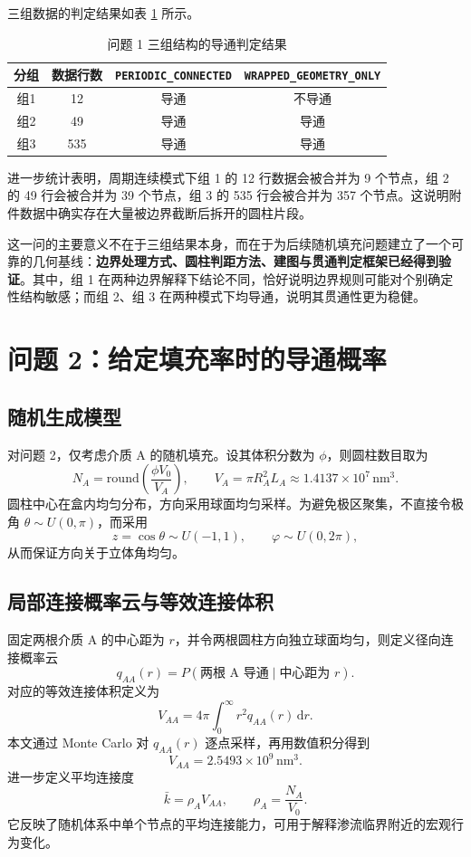 三组数据的判定结果如表 \ref{tab:q1_result} 所示。

\begin{table}[htbp]
    \centering
    \caption{问题 1 三组结构的导通判定结果}
    \label{tab:q1_result}
    \begin{tabular}{cccc}
        \hline
        分组 & 数据行数 & \texttt{PERIODIC\_CONNECTED} & \texttt{WRAPPED\_GEOMETRY\_ONLY} \\
        \hline
        组1 & 12  & 导通 & 不导通 \\
        组2 & 49  & 导通 & 导通 \\
        组3 & 535 & 导通 & 导通 \\
        \hline
    \end{tabular}
\end{table}

进一步统计表明，周期连续模式下组 1 的 12 行数据会被合并为 9 个节点，组 2 的 49 行会被合并为 39 个节点，组 3 的 535 行会被合并为 357 个节点。这说明附件数据中确实存在大量被边界截断后拆开的圆柱片段。

这一问的主要意义不在于三组结果本身，而在于为后续随机填充问题建立了一个可靠的几何基线：\textbf{边界处理方式、圆柱判距方法、建图与贯通判定框架已经得到验证}。其中，组 1 在两种边界解释下结论不同，恰好说明边界规则可能对个别确定性结构敏感；而组 2、组 3 在两种模式下均导通，说明其贯通性更为稳健。

\section{问题 2：给定填充率时的导通概率}

\subsection{随机生成模型}

对问题 2，仅考虑介质 A 的随机填充。设其体积分数为 $\phi$，则圆柱数目取为
\[
N_A=\mathrm{round}\!\left(\frac{\phi V_0}{V_A}\right),\qquad
V_A=\pi R_A^2L_A\approx 1.4137\times 10^7\,\mathrm{nm}^3.
\]
圆柱中心在盒内均匀分布，方向采用球面均匀采样。为避免极区聚集，不直接令极角 $\theta\sim U(0,\pi)$，而采用
\[
z=\cos\theta\sim U(-1,1),\qquad \varphi\sim U(0,2\pi),
\]
从而保证方向关于立体角均匀。

\subsection{局部连接概率云与等效连接体积}

固定两根介质 A 的中心距为 $r$，并令两根圆柱方向独立球面均匀，则定义径向连接概率云
\[
q_{AA}(r)=P(\text{两根 A 导通}\mid \text{中心距为 }r).
\]
对应的等效连接体积定义为
\[
V_{AA}=4\pi\int_0^\infty r^2 q_{AA}(r)\,\mathrm{d}r.
\]
本文通过 Monte Carlo 对 $q_{AA}(r)$ 逐点采样，再用数值积分得到
\[
V_{AA}=2.5493\times 10^9\,\mathrm{nm}^3.
\]
进一步定义平均连接度
\[
\bar{k}=\rho_A V_{AA},\qquad \rho_A=\frac{N_A}{V_0}.
\]
它反映了随机体系中单个节点的平均连接能力，可用于解释渗流临界附近的宏观行为变化。

